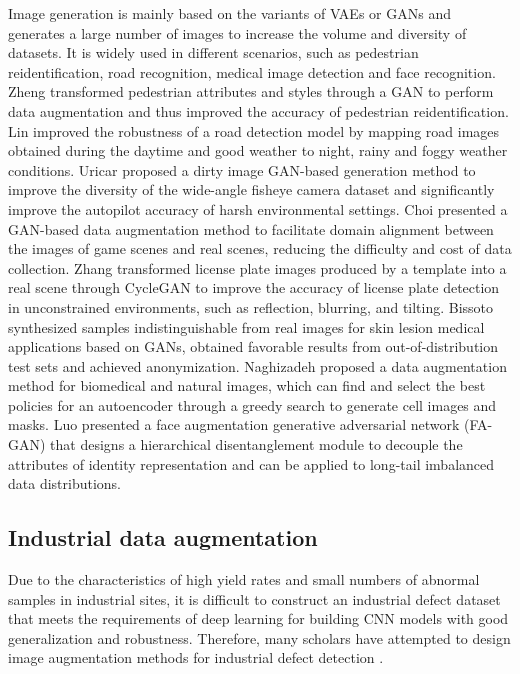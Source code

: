 \documentclass[sn-mathphys]{sn-jnl}%
\theoremstyle{thmstyleone}%
\theoremstyle{thmstyletwo}%
\theoremstyle{thmstylethree}%
\begin{document}
Image generation is mainly based on the variants of VAEs or GANs and generates a large number of images to increase the volume and diversity of datasets. It is widely used in different scenarios, such as pedestrian reidentification, road recognition, medical image detection and face recognition.
Zheng \cite{zheng2019joint} transformed pedestrian attributes and styles through a GAN to perform data augmentation and thus improved the accuracy of pedestrian reidentification.
Lin \cite{lin2020gan} improved the robustness of a road detection model by mapping road images obtained during the daytime and good weather to night, rainy and foggy weather conditions.
Uricar \cite{uricar2021let} proposed a dirty image GAN-based generation method to improve the diversity of the wide-angle fisheye camera dataset and significantly improve the autopilot accuracy of harsh environmental settings.
Choi \cite{choi2019self} presented a GAN-based data augmentation method to facilitate domain alignment between the images of game scenes and real scenes, reducing the difficulty and cost of data collection.
Zhang \cite{zhang2020robust} transformed license plate images produced by a template into a real scene through CycleGAN \cite{zhu2017unpaired} to improve the accuracy of license plate detection in unconstrained environments, such as reflection, blurring, and tilting.
Bissoto \cite{bissoto2021gan} synthesized samples indistinguishable from real images for skin lesion medical applications based on GANs, obtained favorable results from out-of-distribution test sets and achieved anonymization. 
Naghizadeh \cite{naghizadeh2021semantic} proposed a data augmentation method for biomedical and natural images, which can find and select the best policies for an autoencoder through a greedy search to generate cell images and masks.
Luo \cite{luo2021fa} presented a face augmentation generative adversarial network (FA-GAN) that designs a hierarchical disentanglement module to decouple the attributes of identity representation and can be applied to long-tail imbalanced data distributions.




\subsection{Industrial data augmentation}

Due to the characteristics of high yield rates and small numbers of abnormal samples in industrial sites, it is difficult to construct an industrial defect dataset that meets the requirements of deep learning for building CNN models with good generalization and robustness. Therefore, many scholars have attempted to design image augmentation methods for industrial defect detection  \cite{hsu2021multiple, schlosser2022improving}.
\end{document}

